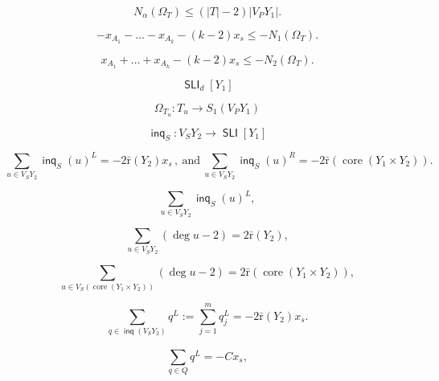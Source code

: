 \documentclass[10pt, reqno]{article}
\begin{document}
\begin{equation}\label{cd2}
N_{\alpha} ( {\Omega}_T )\le (|T| - 2) |V_P Y_1 |  .
\end{equation}

\begin{equation}\label{inqa}
- x_{A_1} -\dots  - x_{A_{k}}  - (k-2)x_s \le   - N_1(\Omega_T)   .
\end{equation}

\begin{equation}\label{inqb}
 x_{A_1} +\dots  + x_{A_{k}}  - (k-2)x_s \le   - N_2(\Omega_T)   .
\end{equation}

\begin{equation}\label{slid}
\operatorname{\textsf{SLI}}_d[Y_1]
\end{equation}

$$
 {\Omega}_{T_u} : T_u \to S_1(V_P Y_1)
 $$

\begin{equation*}
\operatorname{\textsf{inq}}_S : V_S Y_2 \to \operatorname{\textsf{SLI}}[Y_1]
\end{equation*}

\begin{equation*}\label{inc2}
\sum_{u \in V_S Y_2}  \operatorname{\textsf{inq}}_S(u)^L = -2 {\bar {\mathrm{r}}} (Y_2) x_s  \, ,   \ \mbox{and}  \
\sum_{u \in  V_S Y_2}  \operatorname{\textsf{inq}}_S(u)^R = -2 {\bar {\mathrm{r}}} ( \operatorname{core}(Y_1 \times  Y_2) )   .
\end{equation*}

$$
\sum_{u \in V_S Y_2 } \operatorname{\textsf{inq}}_S(u)^L ,
$$

\begin{equation}\label{add1a}
\sum_{u \in V_S Y_2}  (\deg u -2) = 2 {\bar {\mathrm{r}}} (Y_2)  ,
\end{equation}

\begin{equation*}
\sum_{u \in V_S (\operatorname{core}(Y_1 \times  Y_2))}  (\deg u -2) = 2{\bar {\mathrm{r}}} (\operatorname{core}(Y_1 \times  Y_2)) ,
\end{equation*}

$$
\sum_{q \in  \operatorname{\textsf{inq}} (V_S  Y_2) }^{}q^L := \sum_{j=1}^{m}q_j^L = - 2 {\bar {\mathrm{r}}}(Y_2)  x_s  .
$$

\begin{equation}\label{l2i11}
\sum_{q \in  Q}^{}q^L = -C x_s  ,
\end{equation}
\end{document}
